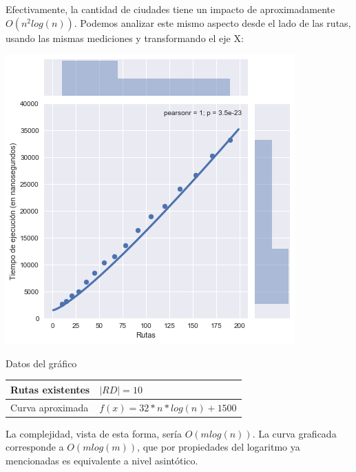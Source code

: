 Efectivamente, la cantidad de ciudades tiene un impacto de aproximadamente $O(n^2log(n))$. Podemos analizar este mismo aspecto desde el lado de las rutas, usando las mismas mediciones y transformando el eje X:

\noindent
\begin{minipage}{0.55\textwidth}
	\hfill
	\includegraphics[scale=0.60]{imagenes/ej3-1-bis.png}
\end{minipage}
\hfill
\begin{minipage}{0.44\textwidth}
	\begin{center}
		Datos del gráfico

		\begin{tabular}{ | l l |}
			\hline
			Rutas existentes & $| RD | = 10$ \\ \hline
			Curva aproximada & $f(x) = 32 * n * log(n) + 1500$ \\
			\hline
		\end{tabular}
	\end{center}
\end{minipage}

La complejidad, vista de esta forma, sería $O(m log(n))$. La curva graficada corresponde a $O(m log(m))$, que por propiedades del logaritmo ya mencionadas es equivalente a nivel asintótico.

